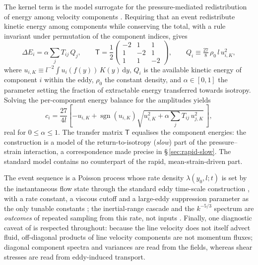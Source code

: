 \documentclass[lineno]{JFM-FLM_Au}
\providecommand{\DIFadd}[1]{{\protect\color{blue}\uwave{#1}}} %
\providecommand{\DIFaddbegin}{} %
\providecommand{\DIFaddend}{} %
\begin{document}
The kernel term is the model surrogate for the pressure-mediated
redistribution of energy among velocity components
\citep{WunschKerstein2001,Kerstein2001}. Requiring that an event
redistribute kinetic energy among components while conserving the total,
with a rule invariant under permutation of the component indices, gives
\begin{equation}
  \Delta E_i = \alpha\sum_j T_{ij}\,Q_j,
  \qquad
  \mathsf{T}=\frac{1}{2}
  \begin{pmatrix}
    -2 & 1 & 1\\ 1 & -2 & 1\\ 1 & 1 & -2
  \end{pmatrix},
  \qquad
  Q_i\equiv\tfrac{27}{8}\,\rho_0\, l\, u_{i,K}^2,
  \label{eq:redistribution}
\end{equation}
where $u_{i,K}\equiv l^{-2}\!\int u_i(f(y))\,K(y)\,\mathrm{d}y$, $Q_i$ is
the available kinetic energy of component $i$ within the eddy, $\rho_0$
the constant density, and $\alpha\in[0,1]$ the parameter setting the
fraction of extractable energy transferred towards isotropy. Solving the
per-component energy balance for the amplitudes yields
\begin{equation}
  c_i = \frac{27}{4l}\left[-u_{i,K}
        +\operatorname{sgn}(u_{i,K})
        \sqrt{u_{i,K}^2+\alpha\sum_j T_{ij}\,u_{j,K}^2}\,\right],
  \label{eq:ci}
\end{equation}
real for $0\le\alpha\le1$. The transfer matrix $\mathsf{T}$ equalises the
component energies: the construction is a model of the
return-to-isotropy (\emph{slow}) part of the pressure--strain
interaction, a correspondence made precise in \S\,\ref{sec:rapid-slow}.
The standard model contains no counterpart of the rapid,
mean-strain-driven part.

The event sequence is a Poisson process whose rate density
$\lambda(y_0,l;t)$ is set by the instantaneous flow state through the
standard eddy time-scale construction \DIFaddbegin \DIFadd{applied to the quantities $Q_i$}\DIFaddend , with a rate constant, a viscous
cutoff and a large-eddy suppression parameter as the only tunable
constants \citep{Kerstein1999,StephensLignell2021}; the inertial-range
cascade and the $k^{-5/3}$ spectrum are \emph{outcomes} of repeated
sampling from this rate, not inputs \citep{Kerstein1999}. Finally, one
diagnostic caveat of \citet{Kerstein2001} is respected throughout:
because the line velocity does not itself advect fluid, off-diagonal
products of line velocity components are not momentum fluxes; diagonal
component spectra and variances are read from the fields, whereas shear
stresses are read from eddy-induced transport.
\end{document}
